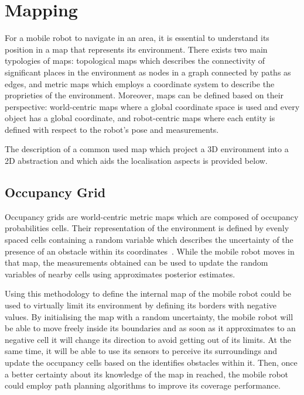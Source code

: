 \section{Mapping}

\noindent For a mobile robot to navigate in an area, it is essential to understand its position in a map that represents its environment.
There exists two main typologies of maps: topological maps which describes the connectivity
of significant places in the environment as nodes in a graph connected by paths as edges, and metric maps which employs a coordinate system to describe the proprieties of the environment.
Moreover, maps can be defined based on their perspective: world-centric maps where a global coordinate space is used and every object has a global coordinate, and robot-centric maps where each entity is defined with respect to the robot's pose and measurements.

The description of a common used map which project a \gls{3D} environment into a \gls{2D} abstraction and which aids the localisation aspects is provided below.

\subsection{Occupancy Grid}
\noindent Occupancy grids are world-centric metric maps which are composed of occupancy probabilities cells.
Their representation of the environment is defined by evenly spaced cells containing a random variable which describes the uncertainty of the presence of an obstacle within its coordinates~\cite{thrun_probabilistic_2005}.
While the mobile robot moves in that map, the measurements obtained can be used to update the random variables of nearby cells using approximates posterior estimates.

Using this methodology to define the internal map of the mobile robot could be used to virtually limit its environment by defining its borders with negative values.
By initialising the map with a random uncertainty, the mobile robot will be able to move freely inside its boundaries and as soon as it approximates to an negative cell it will change its direction to avoid getting out of its limits.
At the same time, it will be able to use its sensors to perceive its surroundings and update the occupancy cells based on the identifies obstacles within it.
Then, once a better certainty about its knowledge of the map in reached, the mobile robot could employ path planning algorithms to improve its coverage performance.




